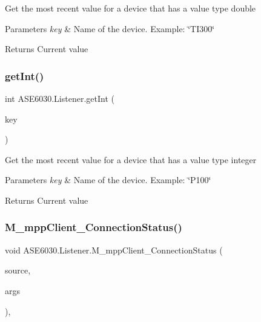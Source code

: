 Get the most recent value for a device that has a value type double 


\begin{DoxyParams}{Parameters}
{\em key} & Name of the device. Example\+: \char`\"{}\+T\+I300\char`\"{}\\
\hline
\end{DoxyParams}
\begin{DoxyReturn}{Returns}
Current value
\end{DoxyReturn}
\mbox{\label{class_a_s_e6030_1_1_listener_a7f82d12db6e97dd86f78dc2f62b23214}} 
\subsubsection{\texorpdfstring{get\+Int()}{getInt()}}
{\footnotesize\ttfamily int A\+S\+E6030.\+Listener.\+get\+Int (\begin{DoxyParamCaption}\item[{string}]{key }\end{DoxyParamCaption})\hspace{0.3cm}{\ttfamily [inline]}}



Get the most recent value for a device that has a value type integer 


\begin{DoxyParams}{Parameters}
{\em key} & Name of the device. Example\+: \char`\"{}\+P100\char`\"{}\\
\hline
\end{DoxyParams}
\begin{DoxyReturn}{Returns}
Current value
\end{DoxyReturn}
\mbox{\label{class_a_s_e6030_1_1_listener_ab7cab9e2e9a1a2bbec9f2d8be25411b1}} 
\subsubsection{\texorpdfstring{M\+\_\+mpp\+Client\+\_\+\+Connection\+Status()}{M\_mppClient\_ConnectionStatus()}}
{\footnotesize\ttfamily void A\+S\+E6030.\+Listener.\+M\+\_\+mpp\+Client\+\_\+\+Connection\+Status (\begin{DoxyParamCaption}\item[{object}]{source,  }\item[{Ua\+Lib.\+Connection\+Status\+Event\+Args}]{args }\end{DoxyParamCaption})\hspace{0.3cm}{\ttfamily [inline]}, {\ttfamily [private]}}



